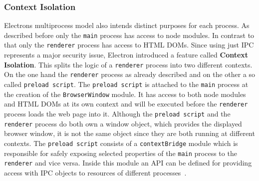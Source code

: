 \subsubsection{Context Isolation}
Electrons multiprocess model also intends distinct purposes for each process.
As described before only the \texttt{main} process has access to node modules.
In contrast to that only the \texttt{renderer} process has access to \ac{HTML} \ac{DOM}s.
Since using just \ac{IPC} represents a major security issue, Electron introduced a feature called \textbf{Context Isolation}.
This splits the logic of a \texttt{renderer} process into two different contexts.
On the one hand the \texttt{renderer} process as already described and on the other a so called \texttt{preload script}.
The \texttt{preload script} is attached to the \texttt{main} process at the creation of the \texttt{BrowserWindow} module.
It has access to both node modules and \ac{HTML} \ac{DOM}s at its own context and will be executed before the \texttt{renderer} process loads the web page into it.
Although the \texttt{preload script} and the \texttt{renderer} process do both own a window object, which provides the displayed browser window, it is not the same object since they are both running at
different contexts.
The \texttt{preload script} consists of a \texttt{contextBridge} module which is responsible for safely exposing selected properties of the \texttt{main} process to the \texttt{renderer} and vice versa.
Inside this module an \ac{API} can be defined for providing access with \ac{IPC} objects to resources of different processes~\cite{ElectronDoc}.

